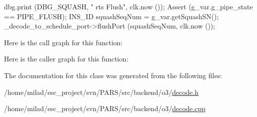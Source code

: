 \begin{DoxyCode}
                                     {
    dbg.print (DBG_SQUASH, "%
      rts Flush", clk.now ());
    Assert (g_var.g_pipe_state == PIPE_FLUSH);
    INS_ID squashSeqNum = g_var.getSquashSN();
    _decode_to_schedule_port->flushPort (squashSeqNum, clk.now ());
}
\end{DoxyCode}


Here is the call graph for this function:




Here is the caller graph for this function:




The documentation for this class was generated from the following files:\begin{DoxyCompactItemize}
\item 
/home/milad/esc\_\-project/svn/PARS/src/backend/o3/\hyperlink{o3_2decode_8h}{decode.h}\item 
/home/milad/esc\_\-project/svn/PARS/src/backend/o3/\hyperlink{o3_2decode_8cpp}{decode.cpp}\end{DoxyCompactItemize}
